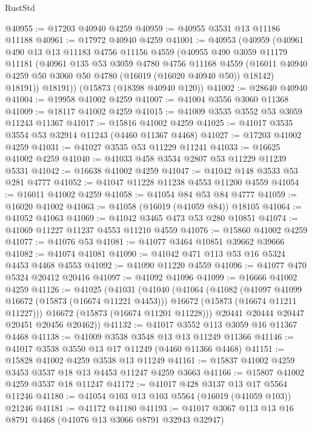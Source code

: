 \begin{lexlean}{RustStd}
\begin{coremodule}
@40955 := @17203 @40940 @4259
@40959 := @40955 @3531 @13 @11186 @11188
@40961 := @17972 @40940 @4259
@41001 := @40953
    (@40959
      (@40961
        @490
        @13
        @13
        @11183
        @4756
        @11156
        @4559
        (@40955
          @490
          @3059
          @11179
          @11181
          (@40961
            @135
            @53
            @3059
            @4780
            @4756
            @11168
            @4559
            (@16011 @40940 @4259 @50 @3060 @50 @4780 (@16019 (@16020 @40940 @50)) @18142)
            @18191))
        @18191))
    (@15873 (@18398 @40940 @120))
@41002 := @28640 @40940
@41004 := @19958 @41002 @4259
@41007 := @41004 @3556 @3060 @11368
@41009 := @18117 @41002 @4259
@41015 := @41009 @3535 @3552 @53 @3059 @11243 @11367
@41017 := @15816 @41002 @4259
@41025 := @41017 @3535 @3554 @53 @32914 @11243 (@4460 @11367 @4468)
@41027 := @17203 @41002 @4259
@41031 := @41027 @3535 @53 @11229 @11241
@41033 := @16625 @41002 @4259
@41040 := @41033 @458 @3534 @2807 @53 @11229 @11239 @5331
@41042 := @16638 @41002 @4259
@41047 := @41042 @148 @3533 @53 @281 @4777
@41052 := @41047 @11228 @11238 @4553 @11200 @4559
@41054 := @16011 @41002 @4259
@41058 := @41054 @84 @53 @84 @4777
@41059 := @16020 @41002
@41063 := @41058 (@16019 (@41059 @84)) @18105
@41064 := @41052 @41063
@41069 := @41042 @3465 @473 @53 @280 @10851
@41074 := @41069 @11227 @11237 @4553 @11210 @4559
@41076 := @15860 @41002 @4259
@41077 := @41076 @53
@41081 := @41077 @3464 @10851 @39662 @39666
@41082 := @41074 @41081
@41090 := @41042 @471 @113 @53 @16 @5324 @4453 @4468 @4553
@41092 := @41090 @11220 @4559
@41096 := @41077 @470 @5324 @20412 @20416
@41097 := @41092 @41096
@41099 := @16666 @41002 @4259
@41126 := @41025
    (@41031
      (@41040
        (@41064
          (@41082
            (@41097 @41099 @16672 (@15873 (@16674 @11221 @4453)))
            @16672
            (@15873 (@16674 @11211 @11227)))
          @16672
          (@15873 (@16674 @11201 @11228)))
        @20441
        @20444
        @20447
        @20451
        @20456
        @20462))
@41132 := @41017 @3552 @113 @3059 @16 @11367 @4468
@41138 := @41009 @3538 @3548 @13 @13 @11249 @11366
@41146 := @41017 @3538 @3550 @13 @17 @11249 (@4460 @11366 @4468)
@41151 := @15828 @41002 @4259 @3538 @13 @11249
@41161 := @15837 @41002 @4259 @3453 @3537 @18 @13 @4453 @11247 @4259 @3663
@41166 := @15807 @41002 @4259 @3537 @18 @11247
@41172 := @41017 @428 @3137 @13 @17 @5564 @11246
@41180 := @41054 @103 @13 @103 @5564 (@16019 (@41059 @103)) @21246
@41181 := @41172 @41180
@41193 := @41017 @3067 @113 @13 @16 @8791 @4468 (@41076 @13 @3066 @8791 @32943 @32947)

\end{coremodule}
\end{lexlean}
